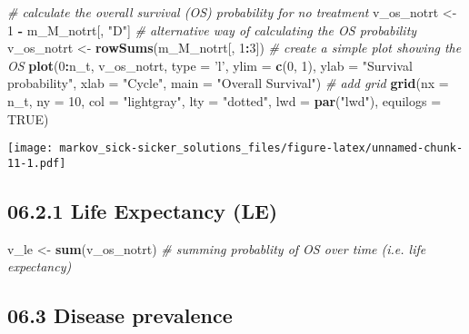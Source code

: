 \documentclass[
]{article}
\newenvironment{Shaded}{\begin{snugshade}}{\end{snugshade}}
\newcommand{\CommentTok}[1]{\textcolor[rgb]{0.56,0.35,0.01}{\textit{#1}}}
\newcommand{\DataTypeTok}[1]{\textcolor[rgb]{0.13,0.29,0.53}{#1}}
\newcommand{\DecValTok}[1]{\textcolor[rgb]{0.00,0.00,0.81}{#1}}
\newcommand{\KeywordTok}[1]{\textcolor[rgb]{0.13,0.29,0.53}{\textbf{#1}}}
\newcommand{\NormalTok}[1]{#1}
\newcommand{\OperatorTok}[1]{\textcolor[rgb]{0.81,0.36,0.00}{\textbf{#1}}}
\newcommand{\OtherTok}[1]{\textcolor[rgb]{0.56,0.35,0.01}{#1}}
\newcommand{\StringTok}[1]{\textcolor[rgb]{0.31,0.60,0.02}{#1}}
\begin{document}
\begin{Shaded}
\begin{Highlighting}[]
\CommentTok{# calculate the overall survival (OS) probability for no treatment}
\NormalTok{v_os_notrt <-}\StringTok{ }\DecValTok{1} \OperatorTok{-}\StringTok{ }\NormalTok{m_M_notrt[, }\StringTok{"D"}\NormalTok{]    }
\CommentTok{# alternative way of calculating the OS probability   }
\NormalTok{v_os_notrt <-}\StringTok{ }\KeywordTok{rowSums}\NormalTok{(m_M_notrt[, }\DecValTok{1}\OperatorTok{:}\DecValTok{3}\NormalTok{])  }
\CommentTok{# create a simple plot showing the OS}
\KeywordTok{plot}\NormalTok{(}\DecValTok{0}\OperatorTok{:}\NormalTok{n_t, v_os_notrt, }\DataTypeTok{type =} \StringTok{'l'}\NormalTok{, }
     \DataTypeTok{ylim =} \KeywordTok{c}\NormalTok{(}\DecValTok{0}\NormalTok{, }\DecValTok{1}\NormalTok{),}
     \DataTypeTok{ylab =} \StringTok{"Survival probability"}\NormalTok{,}
     \DataTypeTok{xlab =} \StringTok{"Cycle"}\NormalTok{,}
     \DataTypeTok{main =} \StringTok{"Overall Survival"}\NormalTok{)          }
\CommentTok{# add grid }
\KeywordTok{grid}\NormalTok{(}\DataTypeTok{nx =}\NormalTok{ n_t, }\DataTypeTok{ny =} \DecValTok{10}\NormalTok{, }\DataTypeTok{col =} \StringTok{"lightgray"}\NormalTok{, }\DataTypeTok{lty =} \StringTok{"dotted"}\NormalTok{, }\DataTypeTok{lwd =} \KeywordTok{par}\NormalTok{(}\StringTok{"lwd"}\NormalTok{), }
     \DataTypeTok{equilogs =} \OtherTok{TRUE}\NormalTok{) }
\end{Highlighting}
\end{Shaded}

\texttt{[image: markov\_sick-sicker\_solutions\_files/figure-latex/unnamed-chunk-11-1.pdf]}

\hypertarget{life-expectancy-le}{%
\subsection{06.2.1 Life Expectancy (LE)}\label{life-expectancy-le}}

\begin{Shaded}
\begin{Highlighting}[]
\NormalTok{v_le <-}\StringTok{ }\KeywordTok{sum}\NormalTok{(v_os_notrt)     }\CommentTok{# summing probablity of OS over time  (i.e. life expectancy)}
\end{Highlighting}
\end{Shaded}

\hypertarget{disease-prevalence}{%
\subsection{06.3 Disease prevalence}\label{disease-prevalence}}
\end{document}
